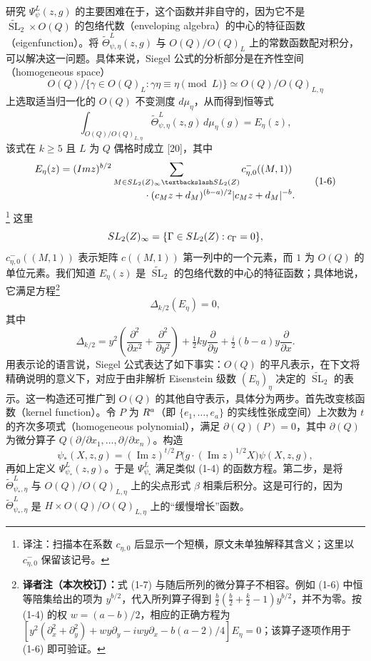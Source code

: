研究 $\Psi_\psi^L(z,g)$ 的主要困难在于，这个函数并非自守的，因为它不是 $\widetilde{\operatorname{SL}}_2\times O(Q)$ 的包络代数（enveloping algebra）的中心的特征函数（eigenfunction）。将 $\widetilde\Theta_{\psi,\eta}^L(z,g)$ 与 $O(Q)/O(Q)_L$ 上的常数函数配对积分，可以解决这一问题。具体来说，Siegel 公式的分析部分是在齐性空间（homogeneous space）
\[
 O(Q)/\{\gamma\in O(Q)_L:\gamma\eta\equiv\eta\pmod L\}
 \simeq O(Q)/O(Q)_{L,\eta}
\]
上选取适当归一化的 $O(Q)$ 不变测度 $d\mu_\eta$，从而得到恒等式
\begin{equation}
 \int_{O(Q)/O(Q)_{L,\eta}}\widetilde\Theta_{\psi,\eta}^L(z,g)\,d\mu_\eta(g)
 =E_\eta(z),\tag{1-5}
\end{equation}
该式在 $k\ge5$ 且 $L$ 为 $Q$ 偶格时成立 [20]，其中
\begin{equation}
\begin{split}
 E_\eta(z)={}&(\operatorname{Im}z)^{b/2}
 \sum_{M\in\operatorname{SL}_2(\Z)_\infty\backslash\operatorname{SL}_2(\Z)}
 c_{\eta,0}^{-}((M,1))\\[-2pt]
 &\hspace{25mm}\cdot(c_Mz+d_M)^{(b-a)/2}|c_Mz+d_M|^{-b}.
\end{split}\tag{1-6}
\end{equation}
\footnote{译注：扫描本在系数 $c_{\eta,0}$ 后显示一个短横，原文未单独解释其含义；这里以 $c_{\eta,0}^{-}$ 保留该记号。}
这里
\[
 SL_2(Z)_\infty=\{\Gamma\in SL_2(Z):c_\Gamma=0\},
\]
$c_{\eta,0}^{-}((M,1))$ 表示矩阵 $c((M,1))$ 第一列中的一个元素，而 $1$ 为 $O(Q)$ 的单位元素。我们知道 $E_\eta(z)$ 是 $\widetilde{\operatorname{SL}}_2$ 的包络代数的中心的特征函数；具体地说，它满足方程\footnote{\textbf{译者注（本次校订）：}式 (1-7) 与随后所列的微分算子不相容。例如 (1-6) 中恒等陪集给出的项为 $y^{b/2}$，代入所列算子得到 $\tfrac b2(\tfrac b2+\tfrac k2-1)y^{b/2}$，并不为零。按 (1-4) 的权 $w=(a-b)/2$，相应的正确方程为 $[y^2(\partial_x^2+\partial_y^2)+wy\partial_y-iwy\partial_x-b(a-2)/4]E_\eta=0$；该算子逐项作用于 (1-6) 即可验证。}
\begin{equation}
 \Delta_{k/2}(E_\eta)=0,\tag{1-7}
\end{equation}
其中
\[
 \Delta_{k/2}=y^2\left(\frac{\partial^2}{\partial x^2}+\frac{\partial^2}{\partial y^2}\right)
 +\tfrac12ky\frac{\partial}{\partial y}
 +\tfrac i2(b-a)y\frac{\partial}{\partial x}.
\]
用表示论的语言说，Siegel 公式表达了如下事实：$O(Q)$ 的平凡表示，在下文将精确说明的意义下，对应于由非解析 Eisenstein 级数 $(E_\eta)_\eta$ 决定的 $\widetilde{\operatorname{SL}}_2$ 的表示。这一构造还可推广到 $O(Q)$ 的其他自守表示，具体分为两步。首先改变核函数（kernel function）。令 $P$ 为 $R^a$（即 $\{e_1,\ldots,e_a\}$ 的实线性张成空间）上次数为 $t$ 的齐次多项式（homogeneous polynomial），满足 $\partial(Q)(P)=0$，其中 $\partial(Q)$ 为微分算子 $Q(\partial/\partial x_1,\ldots,\partial/\partial x_n)$。构造
\[
 \psi_*(X,z,g)=(\operatorname{Im}z)^{t/2}
 P\bigl(g\cdot(\operatorname{Im}z)^{1/2}X\bigr)\psi(X,z,g),
\]
再如上定义 $\Psi_{\psi_*}^L(z,g)$。于是 $\Psi_{\psi_*}^L$ 满足类似 (1-4) 的函数方程。第二步，是将 $\widetilde\Theta_{\psi_*,\eta}^L$ 与 $O(Q)/O(Q)_{L,\eta}$ 上的尖点形式 $\beta$ 相乘后积分。这是可行的，因为 $\widetilde\Theta_{\psi_*,\eta}^L$ 是 $H\times O(Q)/O(Q)_{L,\eta}$ 上的“缓慢增长”函数。

